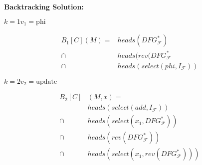 \vspace{1cm}
\begin{minipage}[t]{6cm}
    \centering
    {\Large\bf Backtracking Solution:}

    $k=1$\quad$v_1=\text{phi}$
    \begin{graybox}
        \setlength{\abovedisplayskip}{0pt}
        \setlength{\belowdisplayskip}{0pt}
        \vspace{-0.5em}
        \begin{align*}
            B_1[C](M)={}&heads(DFG_\mathcal{F}^*)\\
                \mathrel\cap{}&heads(rev(DFG_\mathcal{F}^*\\
                \mathrel\cap{}&heads(select(phi,I_\mathcal{F}))
        \end{align*}
    \end{graybox}
    \vspace{-0.75em}
    \hspace{0.3cm}
    \hspace{0.3cm}

    $k=2$\quad$v_2=\text{update}$
    \begin{graybox}
        \setlength{\abovedisplayskip}{0pt}
        \setlength{\belowdisplayskip}{0pt}
        \vspace{-0.5em}
        \begin{align*}
            B_2[C]&(M,x)=\\
                            {}&heads(select(add,I_\mathcal{F}))\\
                \mathrel\cap{}&heads(select(x_1,DFG_\mathcal{F}^*))\\
                \mathrel\cap{}&heads(rev(DFG_\mathcal{F}^*))\\
                \mathrel\cap{}&heads(select(x_1,rev(DFG_\mathcal{F}^*)))
        \end{align*}
    \end{graybox}
    \vspace{-0.75em}
    \hspace{0.3cm}
    \hspace{0.3cm}


\end{minipage}
